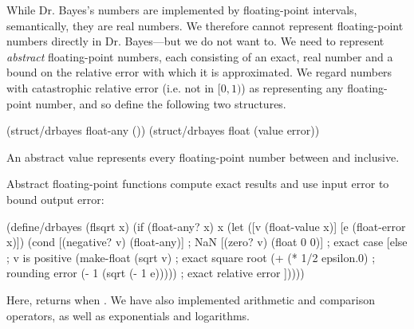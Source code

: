 While Dr. Bayes's numbers are implemented by floating-point intervals, semantically, they are real numbers.
We therefore cannot represent floating-point numbers directly in Dr. Bayes---but we do not want to.
We need to represent \emph{abstract} floating-point numbers, each consisting of an exact, real number and a bound on the relative error with which it is approximated.
We regard numbers with catastrophic relative error (i.e. not in $[0,1)$) as representing any floating-point number, and so define the following two structures.
\begin{center}\singlespacing
\begin{schemedisplay}
(struct/drbayes float-any ())
(struct/drbayes float (value error))
\end{schemedisplay}
\end{center}
An abstract value  represents every floating-point number between  and  inclusive.

Abstract floating-point functions compute exact results and use input error to bound output error:
\begin{center}\singlespacing
\begin{schemedisplay}
(define/drbayes (flsqrt x)
  (if (float-any? x)
      x
      (let ([v  (float-value x)]
            [e  (float-error x)])
        (cond [(negative? v)  (float-any)]  ; NaN
              [(zero? v)      (float 0 0)]  ; exact case
              [else
               ; v is positive
               (make-float (sqrt v)                   ; exact square root
                           (+ (* 1/2 epsilon.0)       ; rounding error
                              (- 1 (sqrt (- 1 e)))))  ; exact relative error
              ]))))
\end{schemedisplay}
\end{center}
Here,  returns  when .
We have also implemented arithmetic and comparison operators, as well as exponentials and logarithms.

